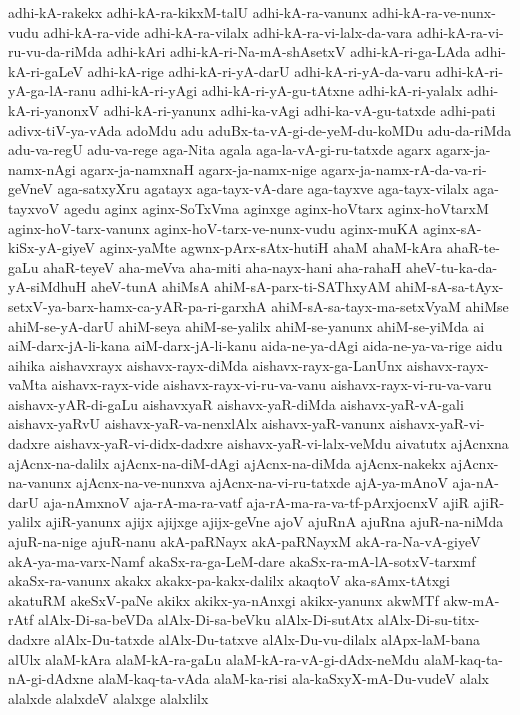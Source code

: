 {adhi-kA-rakekx
adhi-kA-ra-kikxM-talU
adhi-kA-ra-vanunx
adhi-kA-ra-ve-nunx-vudu
adhi-kA-ra-vide
adhi-kA-ra-vilalx
adhi-kA-ra-vi-lalx-da-vara
adhi-kA-ra-vi-ru-vu-da-riMda
adhi-kAri
adhi-kA-ri-Na-mA-shAsetxV
adhi-kA-ri-ga-LAda
adhi-kA-ri-gaLeV
adhi-kA-rige
adhi-kA-ri-yA-darU
adhi-kA-ri-yA-da-varu
adhi-kA-ri-yA-ga-lA-ranu
adhi-kA-ri-yAgi
adhi-kA-ri-yA-gu-tAtxne
adhi-kA-ri-yalalx
adhi-kA-ri-yanonxV
adhi-kA-ri-yanunx
adhi-ka-vAgi
adhi-ka-vA-gu-tatxde
adhi-pati
adivx-tiV-ya-vAda
adoMdu
adu
aduBx-ta-vA-gi-de-yeM-du-koMDu
adu-da-riMda
adu-va-regU
adu-va-rege
aga-Nita
agala
aga-la-vA-gi-ru-tatxde
agarx
agarx-ja-namx-nAgi
agarx-ja-namxnaH
agarx-ja-namx-nige
agarx-ja-namx-rA-da-va-ri-geVneV
aga-satxyXru
agatayx
aga-tayx-vA-dare
aga-tayxve
aga-tayx-vilalx
aga-tayxvoV
agedu
aginx
aginx-SoTxVma
aginxge
aginx-hoVtarx
aginx-hoVtarxM
aginx-hoV-tarx-vanunx
aginx-hoV-tarx-ve-nunx-vudu
aginx-muKA
aginx-sA-kiSx-yA-giyeV
aginx-yaMte
agwnx-pArx-sAtx-hutiH
ahaM
ahaM-kAra
ahaR-te-gaLu
ahaR-teyeV
aha-meVva
aha-miti
aha-nayx-hani
aha-rahaH
aheV-tu-ka-da-yA-siMdhuH
aheV-tunA
ahiMsA
ahiM-sA-parx-ti-SAThxyAM
ahiM-sA-sa-tAyx-setxV-ya-barx-hamx-ca-yAR-pa-ri-garxhA
ahiM-sA-sa-tayx-ma-setxVyaM
ahiMse
ahiM-se-yA-darU
ahiM-seya
ahiM-se-yalilx
ahiM-se-yanunx
ahiM-se-yiMda
ai
aiM-darx-jA-li-kana
aiM-darx-jA-li-kanu
aida-ne-ya-dAgi
aida-ne-ya-va-rige
aidu
aihika
aishavxrayx
aishavx-rayx-diMda
aishavx-rayx-ga-LanUnx
aishavx-rayx-vaMta
aishavx-rayx-vide
aishavx-rayx-vi-ru-va-vanu
aishavx-rayx-vi-ru-va-varu
aishavx-yAR-di-gaLu
aishavxyaR
aishavx-yaR-diMda
aishavx-yaR-vA-gali
aishavx-yaRvU
aishavx-yaR-va-nenxlAlx
aishavx-yaR-vanunx
aishavx-yaR-vi-dadxre
aishavx-yaR-vi-didx-dadxre
aishavx-yaR-vi-lalx-veMdu
aivatutx
ajAcnxna
ajAcnx-na-dalilx
ajAcnx-na-diM-dAgi
ajAcnx-na-diMda
ajAcnx-nakekx
ajAcnx-na-vanunx
ajAcnx-na-ve-nunxva
ajAcnx-na-vi-ru-tatxde
ajA-ya-mAnoV
aja-nA-darU
aja-nAmxnoV
aja-rA-ma-ra-vatf
aja-rA-ma-ra-va-tf-pArxjocnxV
ajiR
ajiR-yalilx
ajiR-yanunx
ajijx
ajijxge
ajijx-geVne
ajoV
ajuRnA
ajuRna
ajuR-na-niMda
ajuR-na-nige
ajuR-nanu
akA-paRNayx
akA-paRNayxM
akA-ra-Na-vA-giyeV
akA-ya-ma-varx-Namf
akaSx-ra-ga-LeM-dare
akaSx-ra-mA-lA-sotxV-tarxmf
akaSx-ra-vanunx
akakx
akakx-pa-kakx-dalilx
akaqtoV
aka-sAmx-tAtxgi
akatuRM
akeSxV-paNe
akikx
akikx-ya-nAnxgi
akikx-yanunx
akwMTf
akw-mA-rAtf
alAlx-Di-sa-beVDa
alAlx-Di-sa-beVku
alAlx-Di-sutAtx
alAlx-Di-su-titx-dadxre
alAlx-Du-tatxde
alAlx-Du-tatxve
alAlx-Du-vu-dilalx
alApx-laM-bana
alUlx
alaM-kAra
alaM-kA-ra-gaLu
alaM-kA-ra-vA-gi-dAdx-neMdu
alaM-kaq-ta-nA-gi-dAdxne
alaM-kaq-ta-vAda
alaM-ka-risi
ala-kaSxyX-mA-Du-vudeV
alalx
alalxde
alalxdeV
alalxge
alalxlilx
}
